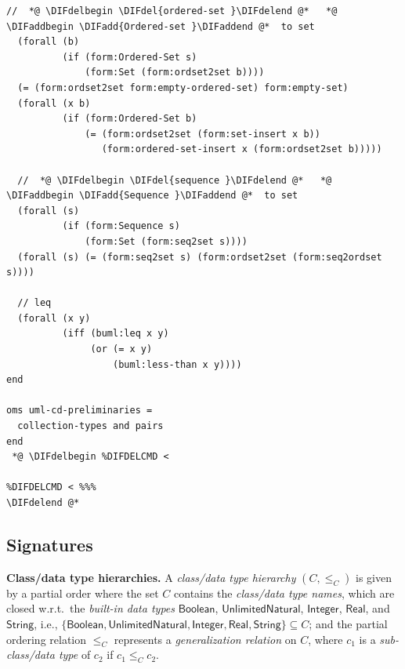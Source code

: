 \documentclass[10pt,fleqn,final]{scrreprt}
\newenvironment{definitions}[0]{\medskip }{}
\newcommand{\uml}[1]{\textsf{#1}}
\providecommand{\DIFadd}[1]{{\protect\color{blue}\uwave{#1}}} %
\providecommand{\DIFdel}[1]{{\protect\color{red}\sout{#1}}}                      %
\providecommand{\DIFaddbegin}{} %
\providecommand{\DIFaddend}{} %
\providecommand{\DIFdelbegin}{} %
\providecommand{\DIFdelend}{} %
\begin{document}
\begin{definitions}
\begin{lstlisting}[language=clif,morekeywords={then,with,logic,oms,end},mathescape]
  //  *@ \DIFdelbegin \DIFdel{ordered-set }\DIFdelend @*   *@ \DIFaddbegin \DIFadd{Ordered-set }\DIFaddend @*  to set
  (forall (b)
          (if (form:Ordered-Set s)
              (form:Set (form:ordset2set b))))
  (= (form:ordset2set form:empty-ordered-set) form:empty-set)
  (forall (x b)
          (if (form:Ordered-Set b)
              (= (form:ordset2set (form:set-insert x b))
                 (form:ordered-set-insert x (form:ordset2set b)))))

  //  *@ \DIFdelbegin \DIFdel{sequence }\DIFdelend @*   *@ \DIFaddbegin \DIFadd{Sequence }\DIFaddend @*  to set
  (forall (s)
          (if (form:Sequence s)
              (form:Set (form:seq2set s))))
  (forall (s) (= (form:seq2set s) (form:ordset2set (form:seq2ordset s))))

  // leq
  (forall (x y)
          (iff (buml:leq x y)
               (or (= x y)
                   (buml:less-than x y))))
end

oms uml-cd-preliminaries =
  collection-types and pairs
end
 *@ \DIFdelbegin %DIFDELCMD < 

%DIFDELCMD < %%%
\DIFdelend @*
\end{lstlisting}


\DIFdelbegin %
\DIFdelend \DIFaddbegin \subsection{Signatures}
\DIFaddend 

\DIFdelbegin %
\DIFdelend \textbf{Class/data type hierarchies.}  A \emph{class/data type
  hierarchy} $(C, {\leq_C})$
is given by a partial order where the set $C$
contains the \emph{class/data type names}, which are closed w.r.t.\ the
\emph{built-in data types} $\mathsf{Boolean}$,
$\mathsf{UnlimitedNatural}$,
$\mathsf{Integer}$,
$\mathsf{Real}$,
and $\mathsf{String}$,
i.e.,
$\{ \mathsf{Boolean}, \mathsf{UnlimitedNatural},\allowbreak
\mathsf{Integer}, \mathsf{Real}, \mathsf{String} \} \subseteq C$;
and the partial ordering relation $\leq_C$ represents a
\emph{generalization relation} on $C$, where $c_1$ is a
\emph{sub-class/data type} of $c_2$ if $c_1 \leq_C c_2$.


\end{definitions}
\end{document}
